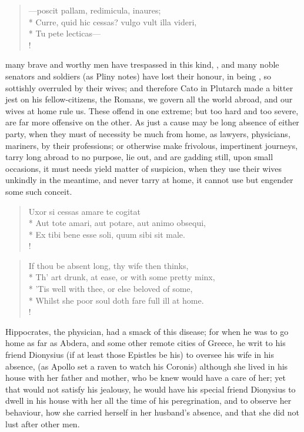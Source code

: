 \begin{latin}%
\begin{verse}%
---poscit pallam, redimicula, inaures;\\*
Curre, quid hic cessas? vulgo vult illa videri,\\*
Tu pete lecticas---\\!
\end{verse}%
\end{latin}%
%
%
many brave and worthy men have trespassed in this kind, , and many noble senators and
soldiers (as Pliny notes) have lost their honour, in being
, so sottishly overruled by their wives; and therefore Cato in
Plutarch made a bitter jest on his fellow-citizens, the Romans, we
govern all the world abroad, and our wives at home rule us. These
offend in one extreme; but too hard and too severe, are far more
offensive on the other. As just a cause may be long absence of either
party, when they must of necessity be much from home, as lawyers,
physicians, mariners, by their professions; or otherwise make
frivolous, impertinent journeys, tarry long abroad to no purpose, lie
out, and are gadding still, upon small occasions, it must needs yield
matter of suspicion, when they use their wives unkindly in the
meantime, and never tarry at home, it cannot use but engender some such
conceit.
%
\begin{latin}%
\begin{verse}%
Uxor si cessas amare te cogitat\\*
Aut tote amari, aut potare, aut animo obsequi,\\*
Ex tibi bene esse soli, quum sibi sit male.\\!
\end{verse}%
\end{latin}%
%
%
\begin{verse}%
If thou be absent long, thy wife then thinks,\\*
Th' art drunk, at ease, or with some pretty minx,\\*
'Tis well with thee, or else beloved of some,\\*
Whilst she poor soul doth fare full ill at home.\\!
\end{verse}%

Hippocrates, the physician, had a smack of this disease; for when he
was to go home as far as Abdera, and some other remote cities of
Greece, he writ to his friend Dionysius (if at least those
Epistles be his)  to oversee his wife in his absence, (as
Apollo set a raven to watch his Coronis) although she lived in his
house with her father and mother, who be knew would have a care of her;
yet that would not satisfy his jealousy, he would have his special
friend Dionysius to dwell in his house with her all the time of his
peregrination, and to observe her behaviour, how she carried herself in
her husband's absence, and that she did not lust after other men.

